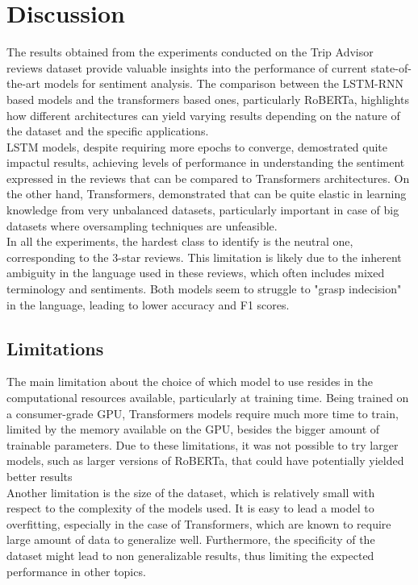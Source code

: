 \section{Discussion}
\label{sec:discussion}
    The results obtained from the experiments conducted on the Trip Advisor 
    reviews dataset provide valuable insights into the performance of
    current state-of-the-art models for sentiment analysis. 
    The comparison between the LSTM-RNN based models and the transformers
    based ones, particularly RoBERTa, highlights how different architectures
    can yield varying results depending on the nature of the dataset and the
    specific applications. \\

    LSTM models, despite requiring more epochs to converge, demostrated
    quite impactul results, achieving levels of performance in understanding 
    the sentiment expressed in the reviews that can be compared to Transformers
    architectures. On the other hand, Transformers, demonstrated that can be quite elastic
    in learning knowledge from very unbalanced datasets, particularly important
    in case of big datasets where oversampling techniques are unfeasible. \\

    In all the experiments, the hardest class to identify is the neutral one, 
    corresponding to the 3-star reviews. This limitation is likely due to the 
    inherent ambiguity in the language used in these reviews, which often
    includes mixed terminology and sentiments. Both models seem to struggle to "grasp 
    indecision" in the language, leading to lower accuracy and F1 scores.

    \subsection{Limitations}
    \label{sec:limitations}
        The main limitation about the choice of which model to use resides in the
        computational resources available, particularly at training time.
        Being trained on a consumer-grade GPU, Transformers models require 
        much more time to train, limited by the memory available on the GPU, besides
        the bigger amount of trainable parameters. Due to these limitations, it 
        was not possible to try larger models, such as larger versions of RoBERTa,
        that could have potentially yielded better results \\

        Another limitation is the size of the dataset, which is relatively small
        with respect to the complexity of the models used. It is easy to lead a model
        to overfitting, especially in the case of Transformers, which are known to
        require large amount of data to generalize well. Furthermore, the specificity
        of the dataset might lead to non generalizable results, thus limiting the 
        expected performance in other topics. \\
